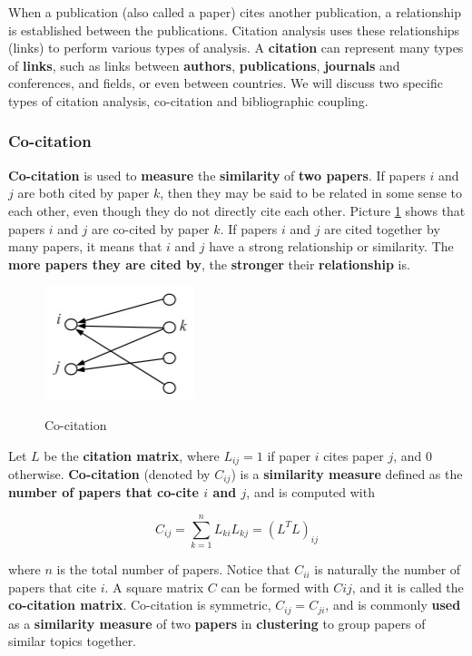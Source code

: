 When a publication (also called a paper) cites another publication, a relationship is established between the publications. Citation analysis uses these relationships (links) to perform various types of analysis. A \textbf{citation} can represent many types of \textbf{links}, such as links between \textbf{authors}, \textbf{publications}, \textbf{journals} and conferences, and fields, or even between countries. We will discuss two specific types of citation analysis, co-citation and bibliographic coupling. 

\subsubsection{Co-citation}
\textbf{Co-citation} is used to \textbf{measure} the \textbf{similarity} of \textbf{two papers}. If papers $i$ and $j$ are both cited by paper $k$, then they may be said to be related in some sense to each other, even though they do not directly cite each other. Picture \ref{co cit} shows that papers $i$ and $j$ are co-cited by paper $k$. If papers $i$ and $j$ are cited together by many papers, it means that $i$ and $j$ have a strong relationship or similarity. The \textbf{more papers they are cited by}, the \textbf{stronger} their \textbf{relationship} is.

\begin{figure}[h!]
		\centering
		\includegraphics[scale = 1.8]{img/co-citation.jpg}
		\label{co cit}
        \caption{Co-citation}
\end{figure}

Let $L$ be the \textbf{citation matrix}, where $L_{ij} = 1 $ if paper $i$ cites paper $j$, and 0 otherwise. \textbf{Co-citation} (denoted by $C_{ij}$) is a \textbf{similarity measure} defined as the \textbf{number of papers that co-cite $i$ and $j$}, and is computed with

$$
C_{ij} = \sum_{k = 1}^n L_{ki}L_{kj} = (L^T L)_{ij}
$$

where $n$ is the total number of papers. Notice that $C_{ii}$ is naturally the number of papers that cite $i$. A square matrix $C$ can be formed with $Cij$, and it is called the \textbf{co-citation matrix}. Co-citation is symmetric, $C_{ij} = C_{ji}$, and is commonly \textbf{used} as a \textbf{similarity measure} of two \textbf{papers} in \textbf{clustering} to group papers of similar topics together.

